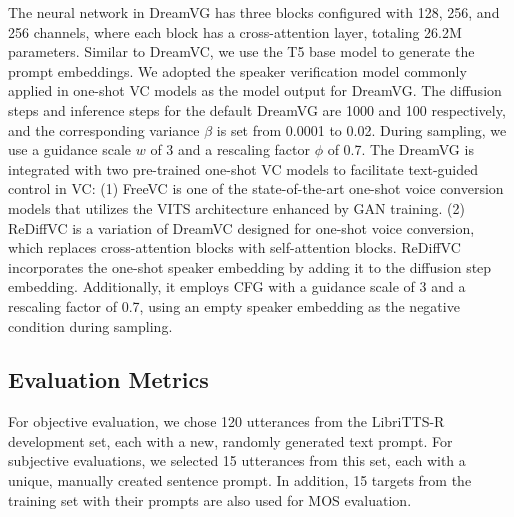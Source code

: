 \documentclass{Interspeech2024}
\begin{document}
The neural network in DreamVG has three blocks configured with 128, 256, and 256 channels, where each block has a cross-attention layer, totaling 26.2M parameters. Similar to DreamVC, we use the T5 base model to generate the prompt embeddings. We adopted the speaker verification model commonly applied in one-shot VC models \cite{li2023freevc, liu2021any} as the model output for DreamVG.
The diffusion steps and inference steps for the default DreamVG are 1000 and 100 respectively, and the corresponding variance $\beta$ is set from 0.0001 to 0.02. During sampling, we use a guidance scale $w$ of 3 and a rescaling factor $\phi$ of 0.7.
The DreamVG is integrated with two pre-trained one-shot VC models to facilitate text-guided control in VC: (1) FreeVC \cite{li2023freevc} is one of the state-of-the-art one-shot voice conversion models that utilizes the VITS \cite{kim2021conditional} architecture enhanced by GAN training. (2) ReDiffVC is a variation of DreamVC designed for one-shot voice conversion, which replaces cross-attention blocks with self-attention blocks. ReDiffVC incorporates the one-shot speaker embedding by adding it to the diffusion step embedding. Additionally, it employs CFG with a guidance scale of 3 and a rescaling factor of 0.7, using an empty speaker embedding as the negative condition during sampling. 

\subsection{Evaluation Metrics}

 For objective evaluation, we chose 120 utterances from the LibriTTS-R development set, each with a new, randomly generated text prompt. For subjective evaluations, we selected 15 utterances from this set, each with a unique, manually created sentence prompt. In addition, 15 targets from the training set with their prompts are also used for MOS evaluation.
\end{document}
